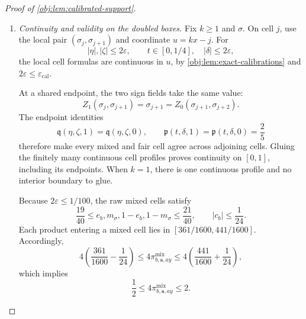\begin{proof}[Proof of \cref{obj:lem:calibrated-support}]
\begin{enumerate}
Combining these estimates with the preceding linear estimates proves, for both mixed branches,
\[
\begin{aligned}
|g(P_{b,\sigma},x)-g(P_{b,\sigma},z)|
&\le k^{1-\alpha}|x-z|,&
|g(P_{b,\sigma},x)-g(P_{b,\sigma},z)|
&\le2k^{-\alpha},\\
|\nu(P_{b,\sigma},x)-\nu(P_{b,\sigma},z)|
&\le k^{1-\beta}|x-z|,&
|\nu(P_{b,\sigma},x)-\nu(P_{b,\sigma},z)|
&\le2k^{-\beta}.
\end{aligned}
\]

\item \textit{Continuity and validity on the doubled boxes.}
Fix \(k\ge1\) and \(\sigma\). On cell \(j\), use the local pair
\((\sigma_j,\sigma_{j+1})\) and coordinate \(u=kx-j\).
For
\[
|\eta|,|\zeta|\le2\varepsilon,
\qquad
t\in[0,1/4],\quad |\delta|\le2\varepsilon,
\]
the local cell formulas are continuous in \(u\), by
\cref{obj:lem:exact-calibrations} and
\(2\varepsilon\le\varepsilon_{\mathrm{cal}}\).

At a shared endpoint, the two sign fields take the same value:
\[
Z_1(\sigma_j,\sigma_{j+1})
=\sigma_{j+1}
=Z_0(\sigma_{j+1},\sigma_{j+2}).
\]
The endpoint identities
\[
\mathfrak q(\eta,\zeta,1)=\mathfrak q(\eta,\zeta,0),
\qquad
\mathfrak p(t,\delta,1)=\mathfrak p(t,\delta,0)=\frac25
\]
therefore make every mixed and fair cell agree across adjoining cells. Gluing the finitely many continuous cell profiles proves continuity on \([0,1]\), including its endpoints. When \(k=1\), there is one continuous profile and no interior boundary to glue.

Because \(2\varepsilon\le1/100\), the raw mixed cells satisfy
\[
\frac{19}{40}\le e_b,m_\sigma,1-e_b,1-m_\sigma\le\frac{21}{40},
\qquad |c_b|\le\frac1{24}.
\]
Each product entering a mixed cell lies in
\([361/1600,441/1600]\). Accordingly,
\[
4\left(\frac{361}{1600}-\frac1{24}\right)
\le4\pi^{\mathrm{mix}}_{b,\mathbf s,ay}
\le4\left(\frac{441}{1600}+\frac1{24}\right),
\]
which implies
\[
\frac12\le4\pi^{\mathrm{mix}}_{b,\mathbf s,ay}\le2.
\]


\end{enumerate}
\end{proof}
